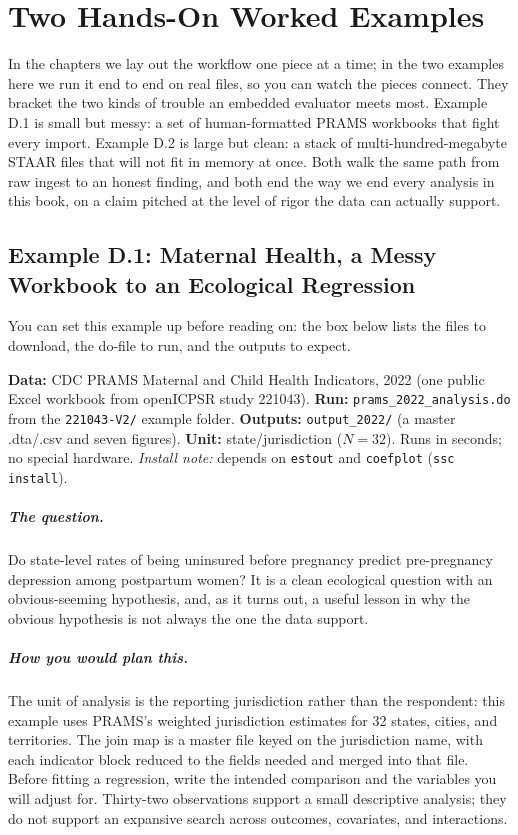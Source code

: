 \documentclass[
    a4paper,
    fontsize=10pt,
    twoside=true,
    numbers=noenddot,
]{kaobook}
\providecommand{\Option}[1]{\textsf{#1}}
\begin{document}
\chapter{Two Hands-On Worked Examples}\label{app:walkthroughs}

In the chapters we lay out the workflow one piece at a time; in the two examples here we run it end to end on real files, so you can watch the pieces connect. They bracket the two kinds of trouble an embedded evaluator meets most. Example D.1 is small but messy: a set of human-formatted PRAMS workbooks that fight every import. Example D.2 is large but clean: a stack of multi-hundred-megabyte STAAR files that will not fit in memory at once. Both walk the same path from raw ingest to an honest finding, and both end the way we end every analysis in this book, on a claim pitched at the level of rigor the data can actually support.

\section*{Example D.1: Maternal Health, a Messy Workbook to an Ecological Regression}
You can set this example up before reading on: the box below lists the files to download, the do-file to run, and the outputs to expect.
\begin{kaobox}[frametitle=Get the files: \texttt{221043-V2/}]
\textbf{Data:} CDC PRAMS Maternal and Child Health Indicators, 2022 (one public Excel workbook from openICPSR study 221043).
\textbf{Run:} \texttt{prams\_2022\_analysis.do} from the \texttt{221043-V2/} example folder. \textbf{Outputs:} \texttt{output\_2022/} (a master \Option{.dta}/\Option{.csv} and seven figures).
\textbf{Unit:} state/jurisdiction ($N=32$). Runs in seconds; no special hardware. \emph{Install note:} depends on \texttt{estout} and \texttt{coefplot} (\texttt{ssc install}).
\end{kaobox}

\paragraph{The question.} Do state-level rates of being uninsured before pregnancy predict pre-pregnancy depression among postpartum women? It is a clean ecological question with an obvious-seeming hypothesis, and, as it turns out, a useful lesson in why the obvious hypothesis is not always the one the data support.

\paragraph{How you would plan this.} The unit of analysis is the reporting jurisdiction rather than the respondent: this example uses PRAMS's weighted jurisdiction estimates for 32 states, cities, and territories. The join map is a master file keyed on the jurisdiction name, with each indicator block reduced to the fields needed and merged into that file. Before fitting a regression, write the intended comparison and the variables you will adjust for. Thirty-two observations support a small descriptive analysis; they do not support an expansive search across outcomes, covariates, and interactions.
\end{document}
